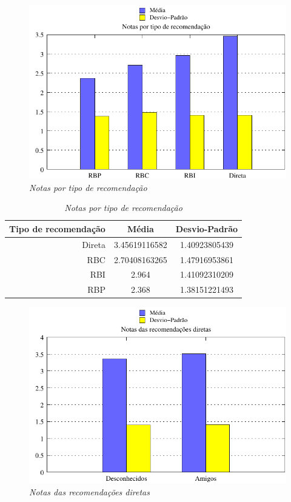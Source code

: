 \begin{figure}
    \centering
    \includegraphics[width=\textwidth]{imagens/grafico_notas_medias}
    \caption{\it Notas por tipo de recomendação}
    \label{fig:notas_medias}
\end{figure}

\begin{table}
\centering
\begin{tabular}{|r|c|c|}
    \hline
    Tipo de recomendação & Média& Desvio-Padrão \\
\hline 
Direta & 3.45619116582 & 1.40923805439 \\
\hline 
RBC & 2.70408163265 & 1.47916953861 \\
\hline 
RBI & 2.964 & 1.41092310209 \\
\hline 
RBP & 2.368 & 1.38151221493 \\
\hline        
\end{tabular}
\caption{\it Notas por tipo de recomendação}
\label{table:notas_medias}
\end{table}


\begin{figure}
    \centering
    \includegraphics[width=\textwidth]{imagens/grafico_notas_medias_diretas}
    \caption{\it Notas das recomendações diretas}
    \label{fig:notas_medias_diretas}
\end{figure}


